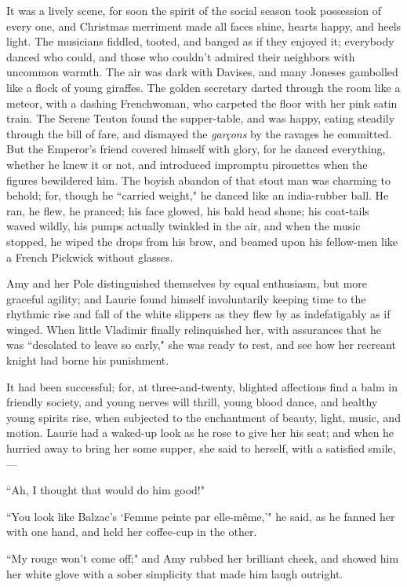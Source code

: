 It was a lively scene, for soon the spirit of the social season took
possession of every one, and Christmas merriment made all faces shine,
hearts happy, and heels light. The musicians fiddled, tooted, and banged
as if they enjoyed it; everybody danced who could, and those who
couldn't admired their neighbors with uncommon warmth.
The air was dark with Davises, and many Joneses gambolled like a flock
of young giraffes. The golden secretary darted through the room like a
meteor, with a dashing Frenchwoman, who carpeted the floor with her pink
satin train. The Serene Teuton found the supper-table, and was happy,
eating steadily through the bill of fare, and dismayed the
\emph{garçons} by the ravages he committed. But the
Emperor's friend covered himself with glory, for he
danced everything, whether he knew it or not, and introduced impromptu
pirouettes when the figures bewildered him. The boyish abandon of that
stout man was charming to behold; for, though he ``carried weight," he
danced like an india-rubber ball. He ran, he flew, he pranced; his face
glowed, his bald head shone; his coat-tails waved wildly, his pumps
actually twinkled in the air, and when the music stopped, he wiped the
drops from his brow, and beamed upon his fellow-men like a French
Pickwick without glasses.

Amy and her Pole distinguished themselves by equal enthusiasm, but more
graceful agility; and Laurie found himself involuntarily keeping time to
the rhythmic rise and fall of the white slippers as they flew by as
indefatigably as if winged. When little Vladimir finally relinquished
her, with assurances that he was ``desolated to leave so early," she was
ready to rest, and see how her recreant knight had borne his punishment.

It had been successful; for, at three-and-twenty, blighted affections
find a balm in friendly society, and young nerves will thrill, young
blood dance, and healthy young spirits rise, when subjected to the
enchantment of beauty, light, music, and motion. Laurie had a waked-up
look as he rose to give her his seat; and when he hurried away to bring
her some supper, she said to herself, with a satisfied smile,---

``Ah, I thought that would do him good!"

``You look like Balzac's `Femme peinte
par elle-même,'" he said, as he fanned her with one hand,
and held her coffee-cup in the other.

``My rouge won't come off;" and Amy rubbed her brilliant
cheek, and showed him her white glove with a sober simplicity that made
him laugh outright.

